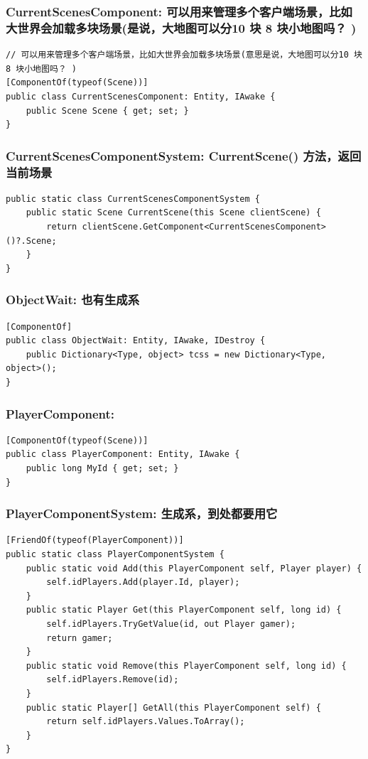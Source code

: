 \documentclass[9pt, b5paper]{article}
\begin{document}
\subsubsection{CurrentScenesComponent: 可以用来管理多个客户端场景，比如大世界会加载多块场景(是说，大地图可以分10 块 8 块小地图吗？ )}
\label{sec-1-2-1}
\begin{verbatim}
// 可以用来管理多个客户端场景，比如大世界会加载多块场景(意思是说，大地图可以分10 块 8 块小地图吗？ )
[ComponentOf(typeof(Scene))]
public class CurrentScenesComponent: Entity, IAwake {
    public Scene Scene { get; set; }
}
\end{verbatim}
\subsubsection{CurrentScenesComponentSystem: CurrentScene() 方法，返回当前场景}
\label{sec-1-2-2}
\begin{verbatim}
public static class CurrentScenesComponentSystem {
    public static Scene CurrentScene(this Scene clientScene) {
        return clientScene.GetComponent<CurrentScenesComponent>()?.Scene;
    }
}
\end{verbatim}
\subsubsection{ObjectWait: 也有生成系}
\label{sec-1-2-3}
\begin{verbatim}
[ComponentOf]
public class ObjectWait: Entity, IAwake, IDestroy {
    public Dictionary<Type, object> tcss = new Dictionary<Type, object>();
}
\end{verbatim}
\subsubsection{PlayerComponent:}
\label{sec-1-2-4}
\begin{verbatim}
[ComponentOf(typeof(Scene))]
public class PlayerComponent: Entity, IAwake {
    public long MyId { get; set; }
}
\end{verbatim}
\subsubsection{PlayerComponentSystem: 生成系，到处都要用它}
\label{sec-1-2-5}
\begin{verbatim}
[FriendOf(typeof(PlayerComponent))]
public static class PlayerComponentSystem {
    public static void Add(this PlayerComponent self, Player player) {
        self.idPlayers.Add(player.Id, player);
    }
    public static Player Get(this PlayerComponent self, long id) {
        self.idPlayers.TryGetValue(id, out Player gamer);
        return gamer;
    }
    public static void Remove(this PlayerComponent self, long id) {
        self.idPlayers.Remove(id);
    }
    public static Player[] GetAll(this PlayerComponent self) {
        return self.idPlayers.Values.ToArray();
    }
}
\end{verbatim}
\end{document}
